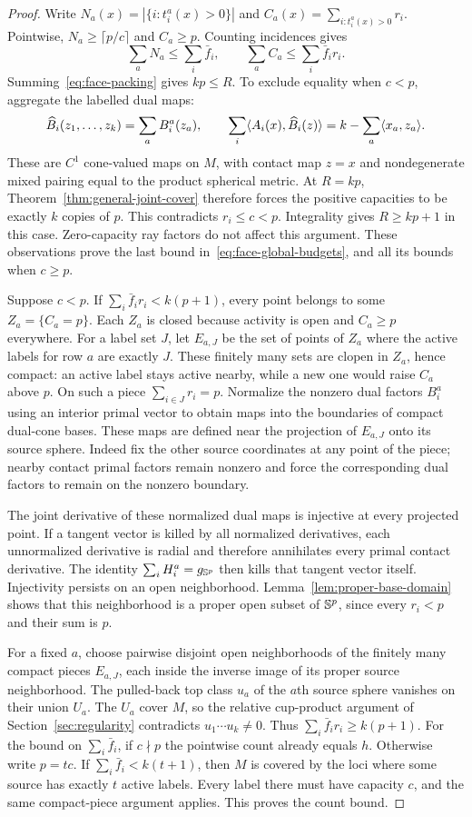 \begin{proof}
Write $N_a(x)=|\{i:t_i^a(x)>0\}|$ and
$C_a(x)=\sum_{i:t_i^a(x)>0}r_i$. Pointwise,
$N_a\geq\lceil p/c\rceil$ and $C_a\geq p$. Counting incidences gives
\[
 \sum_aN_a\leq\sum_i\bar f_i,\qquad
 \sum_aC_a\leq\sum_i\bar f_i r_i.
\]
Summing~\eqref{eq:face-packing} gives $kp\leq R$. To exclude equality
when $c<p$, aggregate the labelled dual maps:
\[
 \widehat B_i(z_1,\ldots,z_k)=\sum_a B_i^a(z_a),\qquad
 \sum_i\langle A_i(x),\widehat B_i(z)\rangle
       =k-\sum_a\langle x_a,z_a\rangle.
\]
These are $C^1$ cone-valued maps on $M$, with contact map $z=x$ and
nondegenerate mixed pairing equal to the product spherical metric.
At $R=kp$, Theorem~\ref{thm:general-joint-cover} therefore forces the
positive capacities to be exactly $k$ copies of $p$. This contradicts
$r_i\leq c<p$. Integrality gives $R\geq kp+1$ in this case.
Zero-capacity ray factors do not affect this argument. These observations
prove the last bound in~\eqref{eq:face-global-budgets}, and all its
bounds when $c\geq p$.

Suppose $c<p$. If $\sum_i\bar f_i r_i<k(p+1)$, every point belongs to
some $Z_a=\{C_a=p\}$. Each $Z_a$ is closed because activity is open
and $C_a\geq p$ everywhere. For a label set $J$, let $E_{a,J}$ be the
set of points of $Z_a$ where the active labels for row $a$ are exactly
$J$. These finitely many sets are clopen in $Z_a$, hence compact: an
active label stays active nearby, while a new one would raise $C_a$
above $p$. On such a piece
$\sum_{i\in J}r_i=p$. Normalize the nonzero dual factors $B_i^a$
using an interior primal vector to obtain maps into the boundaries of
compact dual-cone bases. These maps are defined near the projection
of $E_{a,J}$ onto its source sphere. Indeed fix the other source
coordinates at any point of the piece; nearby contact primal factors
remain nonzero and force the corresponding dual factors to remain on
the nonzero boundary.

The joint derivative of these normalized dual maps is injective at
every projected point. If a tangent vector is killed by all normalized
derivatives, each unnormalized derivative is radial and therefore
annihilates every primal contact derivative. The identity
$\sum_iH_i^a=g_{\mathbb S^p}$ then kills that tangent vector itself.
Injectivity persists on an open neighborhood. Lemma~\ref{lem:proper-base-domain}
shows that this neighborhood is a proper open subset of $\mathbb S^p$,
since every $r_i<p$ and their sum is $p$.

For a fixed $a$, choose pairwise disjoint open neighborhoods of the
finitely many compact pieces $E_{a,J}$, each inside the inverse image
of its proper source neighborhood. The pulled-back top class $u_a$ of
the $a$th source sphere vanishes on their union
$U_a$. The $U_a$ cover $M$, so the relative
cup-product argument of Section~\ref{sec:regularity} contradicts
$u_1\cdots u_k\ne0$. Thus $\sum_i\bar f_ir_i\geq k(p+1)$.
For the bound on $\sum_i\bar f_i$, if $c\nmid p$ the pointwise count already equals
$h$. Otherwise write $p=tc$. If $\sum_i\bar f_i<k(t+1)$, then $M$
is covered by the loci where some source has exactly $t$ active
labels. Every label there must have capacity $c$, and the same
compact-piece argument applies. This proves the count bound.


\end{proof}
